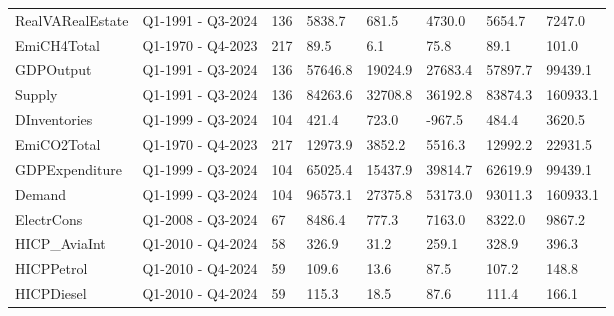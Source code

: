 \begin{longtable}[t]{llllllll}
RealVARealEstate & Q1-1991 - Q3-2024 & 136 & 5838.7 & 681.5 & 4730.0 & 5654.7 & 7247.0\\
EmiCH4Total & Q1-1970 - Q4-2023 & 217 & 89.5 & 6.1 & 75.8 & 89.1 & 101.0\\
GDPOutput & Q1-1991 - Q3-2024 & 136 & 57646.8 & 19024.9 & 27683.4 & 57897.7 & 99439.1\\
Supply & Q1-1991 - Q3-2024 & 136 & 84263.6 & 32708.8 & 36192.8 & 83874.3 & 160933.1\\
\addlinespace
DInventories & Q1-1999 - Q3-2024 & 104 & 421.4 & 723.0 & -967.5 & 484.4 & 3620.5\\
EmiCO2Total & Q1-1970 - Q4-2023 & 217 & 12973.9 & 3852.2 & 5516.3 & 12992.2 & 22931.5\\
GDPExpenditure & Q1-1999 - Q3-2024 & 104 & 65025.4 & 15437.9 & 39814.7 & 62619.9 & 99439.1\\
Demand & Q1-1999 - Q3-2024 & 104 & 96573.1 & 27375.8 & 53173.0 & 93011.3 & 160933.1\\
ElectrCons & Q1-2008 - Q3-2024 & 67 & 8486.4 & 777.3 & 7163.0 & 8322.0 & 9867.2\\
\addlinespace
HICP\_AviaInt & Q1-2010 - Q4-2024 & 58 & 326.9 & 31.2 & 259.1 & 328.9 & 396.3\\
HICPPetrol & Q1-2010 - Q4-2024 & 59 & 109.6 & 13.6 & 87.5 & 107.2 & 148.8\\
HICPDiesel & Q1-2010 - Q4-2024 & 59 & 115.3 & 18.5 & 87.6 & 111.4 & 166.1\\
\bottomrule
\end{longtable}
\endgroup{}

